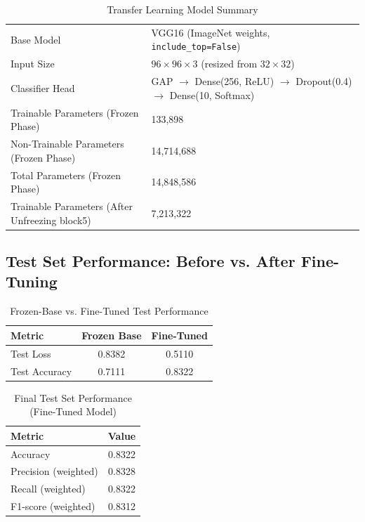 \documentclass[11pt]{article}
\begin{document}
\begin{table}[H]
\centering
\caption{Transfer Learning Model Summary}
\begin{tabular}{ll}
\toprule
Base Model & VGG16 (ImageNet weights, \texttt{include\_top=False}) \\
Input Size & $96\times96\times3$ (resized from $32\times32$) \\
Classifier Head & GAP $\rightarrow$ Dense(256, ReLU) $\rightarrow$ Dropout(0.4) $\rightarrow$ Dense(10, Softmax) \\
Trainable Parameters (Frozen Phase) & 133,898 \\
Non-Trainable Parameters (Frozen Phase) & 14,714,688 \\
Total Parameters (Frozen Phase) & 14,848,586 \\
Trainable Parameters (After Unfreezing block5) & 7,213,322 \\
\bottomrule
\end{tabular}
\end{table}

\subsection*{Test Set Performance: Before vs. After Fine-Tuning}

\begin{table}[H]
\centering
\caption{Frozen-Base vs. Fine-Tuned Test Performance}
\begin{tabular}{lcc}
\toprule
Metric & Frozen Base & Fine-Tuned \\
\midrule
Test Loss & 0.8382 & 0.5110 \\
Test Accuracy & 0.7111 & 0.8322 \\
\bottomrule
\end{tabular}
\end{table}

\begin{table}[H]
\centering
\caption{Final Test Set Performance (Fine-Tuned Model)}
\begin{tabular}{lc}
\toprule
Metric & Value \\
\midrule
Accuracy & 0.8322 \\
Precision (weighted) & 0.8328 \\
Recall (weighted) & 0.8322 \\
F1-score (weighted) & 0.8312 \\
\bottomrule
\end{tabular}
\end{table}
\end{document}
